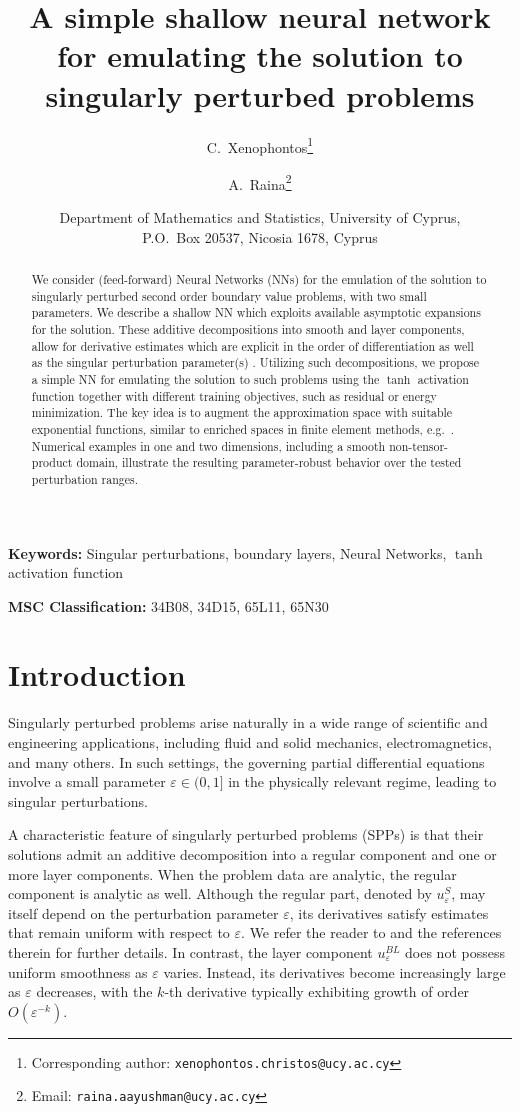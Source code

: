 \documentclass[11pt]{article}
\title{A simple shallow neural network for emulating the solution to singularly perturbed problems}
\author{C.~Xenophontos\thanks{Corresponding author: \texttt{xenophontos.christos@ucy.ac.cy}} \and
A.~Raina\thanks{Email: \texttt{raina.aayushman@ucy.ac.cy}}}
\date{Department of Mathematics and Statistics, University of Cyprus,\\
P.O.~Box 20537, Nicosia 1678, Cyprus}
\providecommand{\e}{\varepsilon}
\theoremstyle{plain}
\theoremstyle{definition}
\theoremstyle{remark}
\numberwithin{equation}{section}
\begin{document}
\maketitle

\begin{abstract}
We consider (feed-forward) Neural Networks (NNs) for the emulation of the solution to singularly 
perturbed second order boundary value problems, with two small parameters. We describe 
a shallow NN which exploits available asymptotic expansions for the solution. These additive decompositions into smooth and layer components, allow for derivative estimates which are explicit in the order of differentiation as well as the singular perturbation parameter(s) \cite{melenk, Irene, SX}. Utilizing such 
decompositions, we propose a simple NN for emulating the solution to such  problems
using the $\tanh$ activation function together with different training objectives, such as residual or energy minimization. The key idea is to augment the approximation space with suitable exponential functions, similar to enriched spaces in finite element methods, e.g.~\cite{Kellogg}. Numerical examples in one and two dimensions, including a smooth non-tensor-product domain, illustrate the resulting parameter-robust behavior over the tested perturbation ranges.
\end{abstract}

\noindent\textbf{Keywords:} Singular perturbations, boundary layers, Neural Networks, $\tanh$ activation function

\medskip
\noindent\textbf{MSC Classification:} 34B08, 34D15, 65L11, 65N30


\section{Introduction}
\label{sec:intro} 


Singularly perturbed problems arise naturally in a wide range of scientific and engineering applications, including fluid and solid mechanics, electromagnetics, and many others. In such settings, the governing partial differential equations involve a small parameter $\e\in(0,1]$ in the physically relevant regime, leading to singular perturbations.

A characteristic feature of singularly perturbed problems (SPPs) is that their solutions admit an additive decomposition into a regular component and one or more layer components. When the problem data are analytic, the regular component is analytic as well. Although the regular part, denoted by $u_\e^{S}$, may itself depend on the perturbation parameter $\e$, its derivatives satisfy estimates that remain uniform with respect to $\e$. We refer the reader to \cite{TemamSgPert} and the references therein for further details.
%
In contrast, the layer component $u_\e^{BL}$ does not possess uniform smoothness as $\e$ varies. Instead, its derivatives become increasingly large as $\e$ decreases, with the $k$-th derivative typically exhibiting growth of order $O(\e^{-k})$.
\end{document}
